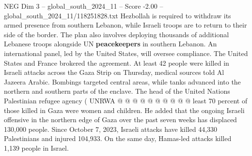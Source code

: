 \begin{textsample}{NEG Dim 3 – global\_south\_2024\_11 – Score -2.00 – global\_south\_2024\_11/118251828.txt}
Hezbollah is required to withdraw its armed presence from southern Lebanon, while Israeli troops are to return to their side of the border.
The plan also involves deploying thousands of additional Lebanese troops alongside UN \textbf{peacekeepers} in southern Lebanon.
An international panel, led by the United States, will oversee compliance.
The United States and France brokered the agreement.
At least 42 people were killed in Israeli attacks across the Gaza Strip on Thursday, medical sources told Al Jazeera Arabic.
Bombings targeted central areas, while tanks advanced into the northern and southern parts of the enclave.
The head of the United Nations Palestinian refugee agency ( UNRWA @ @ @ @ @ @ @ @ @ @ least 70 percent of those killed in Gaza were women and children.
He added that the ongoing Israeli offensive in the northern edge of Gaza over the past seven weeks has displaced 130,000 people.
Since October 7, 2023, Israeli attacks have killed 44,330 Palestinians and injured 104,933.
On the same day, Hamas-led attacks killed 1,139 people in Israel.

\end{textsample}
